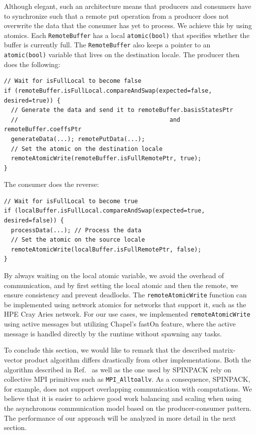 Although elegant, such an architecture means that producers and consumers have to synchronize such that a remote put operation from a producer does not overwrite the data that the consumer has yet to process. We achieve this by using atomics. Each \verb|RemoteBuffer| has a local \verb|atomic(bool)| that specifies whether the buffer is currently full. The \verb|RemoteBuffer| also keeps a pointer to an \verb|atomic(bool)| variable that lives on the destination locale. The producer then does the following:
\vspace{-0.1cm}\begin{verbatim}
// Wait for isFullLocal to become false
if (remoteBuffer.isFullLocal.compareAndSwap(expected=false, desired=true)) {
  // Generate the data and send it to remoteBuffer.basisStatesPtr
  //                                           and remoteBuffer.coeffsPtr
  generateData(...); remotePutData(...);
  // Set the atomic on the destination locale
  remoteAtomicWrite(remoteBuffer.isFullRemotePtr, true);
}
\end{verbatim}
\vspace{-0.1cm}The consumer does the reverse:
\vspace{-0.1cm}\begin{verbatim}
// Wait for isFullLocal to become true
if (localBuffer.isFullLocal.compareAndSwap(expected=true, desired=false)) {
  processData(...); // Process the data
  // Set the atomic on the source locale
  remoteAtomicWrite(localBuffer.isFullRemotePtr, false);
}
\end{verbatim}

\vspace{-0.1cm}By always waiting on the local atomic variable, we avoid the overhead of communication, and by first setting the local atomic and then the remote, we ensure consistency and prevent deadlocks. The \verb|remoteAtomicWrite| function can be implemented using network atomics for networks that support it, such as the HPE Cray Aries network. For our use cases, we implemented \verb|remoteAtomicWrite| using active messages but utilizing Chapel's fastOn feature, where the active message is handled directly by the runtime without spawning any tasks.

To conclude this section, we would like to remark that the described matrix-vector product algorithm differs drastically from other implementations. Both the algorithm described in Ref.~\cite{Wietek2018subla} as well as the one used by SPINPACK rely on collective MPI primitives such as \verb|MPI_Alltoallv|. As a consequence, SPINPACK, for example, does not support overlapping communication with computations. We believe that it is easier to achieve good work balancing and scaling when using the asynchronous communication model based on the producer-consumer pattern. The performance of our approach will be analyzed in more detail in the next section.

